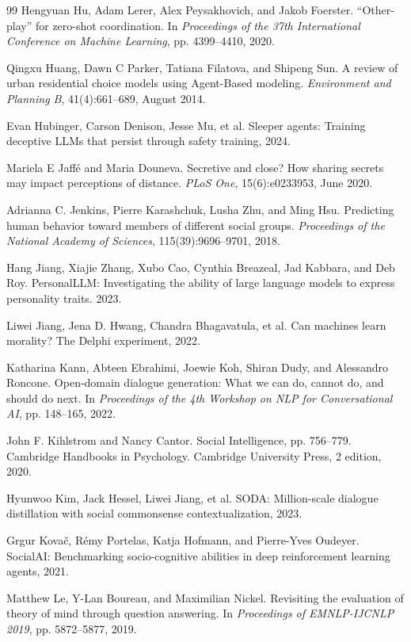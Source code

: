 \documentclass[11pt,a4paper]{article}
\begin{document}
\begin{thebibliography}{99}
Hengyuan Hu, Adam Lerer, Alex Peysakhovich, and Jakob Foerster. ``Other-play'' for zero-shot coordination. In \textit{Proceedings of the 37th International Conference on Machine Learning}, pp. 4399--4410, 2020.

Qingxu Huang, Dawn C Parker, Tatiana Filatova, and Shipeng Sun. A review of urban residential choice models using Agent-Based modeling. \textit{Environment and Planning B}, 41(4):661--689, August 2014.

Evan Hubinger, Carson Denison, Jesse Mu, et al. Sleeper agents: Training deceptive LLMs that persist through safety training, 2024.

Mariela E Jaffé and Maria Douneva. Secretive and close? How sharing secrets may impact perceptions of distance. \textit{PLoS One}, 15(6):e0233953, June 2020.

Adrianna C. Jenkins, Pierre Karashchuk, Lusha Zhu, and Ming Hsu. Predicting human behavior toward members of different social groups. \textit{Proceedings of the National Academy of Sciences}, 115(39):9696--9701, 2018.

Hang Jiang, Xiajie Zhang, Xubo Cao, Cynthia Breazeal, Jad Kabbara, and Deb Roy. PersonalLLM: Investigating the ability of large language models to express personality traits. 2023.

Liwei Jiang, Jena D. Hwang, Chandra Bhagavatula, et al. Can machines learn morality? The Delphi experiment, 2022.

Katharina Kann, Abteen Ebrahimi, Joewie Koh, Shiran Dudy, and Alessandro Roncone. Open-domain dialogue generation: What we can do, cannot do, and should do next. In \textit{Proceedings of the 4th Workshop on NLP for Conversational AI}, pp. 148--165, 2022.

John F. Kihlstrom and Nancy Cantor. Social Intelligence, pp. 756--779. Cambridge Handbooks in Psychology. Cambridge University Press, 2 edition, 2020.

Hyunwoo Kim, Jack Hessel, Liwei Jiang, et al. SODA: Million-scale dialogue distillation with social commonsense contextualization, 2023.

Grgur Kovač, Rémy Portelas, Katja Hofmann, and Pierre-Yves Oudeyer. SocialAI: Benchmarking socio-cognitive abilities in deep reinforcement learning agents, 2021.

Matthew Le, Y-Lan Boureau, and Maximilian Nickel. Revisiting the evaluation of theory of mind through question answering. In \textit{Proceedings of EMNLP-IJCNLP 2019}, pp. 5872--5877, 2019.


\end{thebibliography}
\end{document}
